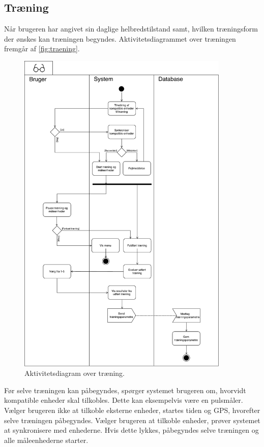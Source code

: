 \subsection{Træning} \label{sec:traening}
Når brugeren har angivet sin daglige helbredstilstand samt, hvilken træningsform der ønskes kan træningen begyndes. Aktivitetsdiagrammet over træningen fremgår af \autoref{fig:traening}. 

\begin{figure} [H]
\centering
\includegraphics[width=0.9\textwidth]{figures/aktivitetsdiagram/Traening}
\caption{Aktivitetsdiagram over træning.}
\label{fig:traening}
\end{figure}

\noindent
Før selve træningen kan påbegyndes, spørger systemet brugeren om, hvorvidt kompatible enheder skal tilkobles. Dette kan eksempelvis være en pulsmåler. Vælger brugeren ikke at tilkoble eksterne enheder, startes tiden og GPS, hvorefter selve træningen påbegyndes. Vælger brugeren at tilkoble enheder, prøver systemet at synkronisere med enhederne.  Hvis dette lykkes, påbegyndes selve træningen og alle måleenhederne starter.


